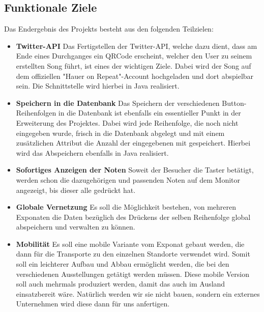 \documentclass[a4paper]{scrartcl}
\begin{document}
\subsection{Funktionale Ziele}
Das Endergebnis des Projekts besteht aus den folgenden Teilzielen:
\begin{itemize}
	\item \textbf{Twitter-API} \newline
	Das Fertigstellen der Twitter-API, welche dazu dient, dass am Ende eines Durchganges ein QRCode erscheint, welcher den User zu seinem erstellten Song führt, ist eines der wichtigen Ziele. Dabei wird der Song auf dem offiziellen "Hauer on Repeat"-Account hochgeladen und dort abspielbar sein. Die Schnittstelle wird hierbei in Java realisiert.

    \item \textbf{Speichern in die Datenbank} \newline 
	Das Speichern der verschiedenen Button-Reihenfolgen in die Datenbank ist ebenfalls ein essentieller Punkt in der Erweiterung des Projektes. Dabei wird jede Reihenfolge, die noch nicht eingegeben wurde, frisch in die Datenbank abgelegt und mit einem zusätzlichen Attribut die Anzahl der eingegebenen mit gespeichert. Hierbei wird das Abspeichern ebenfalls in Java realisiert. 
	
	\item \textbf{Sofortiges Anzeigen der Noten} \newline
	Soweit der Besucher die Taster betätigt, werden schon die dazugehörigen und passenden Noten auf dem Monitor angezeigt, bis dieser alle gedrückt hat.  
	
	\item \textbf{Globale Vernetzung} \newline 
	Es soll die Möglichkeit bestehen, von mehreren Exponaten die Daten bezüglich des Drückens der selben Reihenfolge global abspeichern und verwalten zu können. 
	
	\item \textbf{Mobilität} \newline 
	Es soll eine mobile Variante vom Exponat gebaut werden, die dann für die Transporte zu den einzelnen Standorte verwendet wird. Somit soll ein leichterer Aufbau und Abbau ermöglicht werden, die bei den verschiedenen Ausstellungen getätigt werden müssen. Diese mobile Version soll auch mehrmals produziert werden, damit das auch im Ausland einsatzbereit wäre. Natürlich werden wir sie nicht bauen, sondern ein externes Unternehmen wird diese dann für uns anfertigen.
	
\end{itemize}
\end{document}
